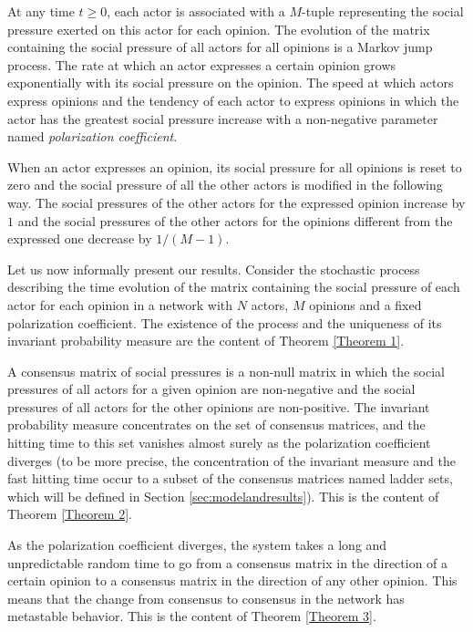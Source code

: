 \documentclass[11pt]{article}
\theoremstyle{definition}
\begin{document}
At any time $t\geq 0$, each actor is associated with a $M$-tuple representing the social pressure exerted on this actor for each opinion. The evolution of the matrix containing the social pressure of all actors for all opinions is a Markov jump process. 
The rate at which an actor expresses a certain opinion grows exponentially with its social pressure on the opinion. The speed at which actors express opinions and the tendency of each actor to express opinions in which the actor has the greatest social pressure increase with a non-negative parameter named \textit{polarization coefficient}.

When an actor expresses an opinion, its social pressure for all opinions is reset to zero and the social pressure of all the other actors is modified in the following way. The social pressures of the other actors for the expressed opinion increase by $1$ and the social pressures of the other actors for the opinions different from the expressed one decrease by $1/(M-1)$.

Let us now informally present our results. Consider the stochastic process describing the time evolution of the matrix containing the social pressure of each actor for each opinion in a network with $N$ actors, $M$ opinions and a fixed polarization coefficient. The existence of the process and the uniqueness of its invariant probability measure are the content of Theorem \ref{Theorem 1}. 

A consensus matrix of social pressures is a non-null matrix in which the social pressures of all actors for a given opinion are non-negative and the social pressures of all actors for the other opinions are non-positive. The invariant probability measure concentrates on the set of consensus matrices, and the hitting time to this set vanishes almost surely as the polarization coefficient diverges (to be more precise, the concentration of the invariant measure and the fast hitting time occur to a subset of the consensus matrices named ladder sets, which will be defined in Section \ref{sec:modelandresults}). This is the content of Theorem \ref{Theorem 2}.

As the polarization coefficient diverges, the system takes a long and unpredictable random time to go from a consensus matrix in the direction of a certain opinion to a consensus matrix in the direction of any other opinion. This means that the change from consensus to consensus in the network has metastable behavior. This is the content of Theorem \ref{Theorem 3}.
\end{document}
